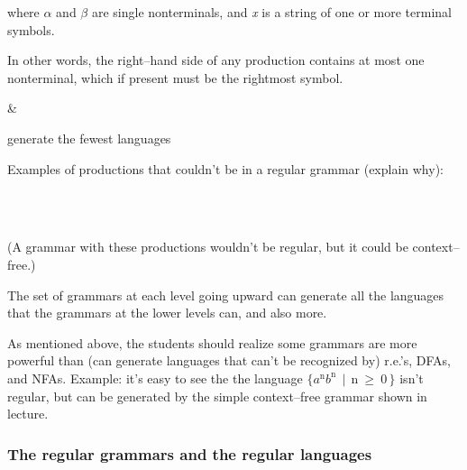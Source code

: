 \documentclass[12pt]{article}
\newcommand{\str}[1]{\emph{\textrm{#1}}}
\newcommand{\mathstr}[1]{\ensuremath{\mathit{#1}}}
\begin{document}
{\begin{longtable}[t]
\begin{multicols}{2}
            \end{multicols}

            \vspace{-3mm}

            where $\alpha$ and $\beta$ are single nonterminals, and \str{x}
            is a string of one or more terminal symbols.

            In other words, the right--hand side of any production contains
            at most one nonterminal, which if present must be the rightmost
            symbol.

          & \raggedright generate the fewest languages
          \tabularnewline

      \end{longtable}

    }

    \vspace{-6mm}

    Examples of productions that couldn't be in a regular grammar (explain
    why):

    \begin{grammar}[1.5]
      \production{\mathrm{S}}{S\mathstr{b}S}
        \\

      \production{\mathrm{S}}{\mathstr{b}S\mathstr{b}}
        \\

    \end{grammar}

    (A grammar with these productions wouldn't be regular, but it could be
     context--free.)

    \smallskip

    The set of grammars at each level going upward can generate all the
    languages that the grammars at the lower levels can, and also more.

    As mentioned above, the students should realize some grammars are more
    powerful than (can generate languages that can't be recognized by)
    r.e.'s, DFAs, and NFAs.  Example: it's easy to see the the language
    \(
      \mathrm{
        \{
          {\mathstr{a}^n}{\mathstr{b}^n} \, \mid \, n \: \ge \: 0 \,
        \}
      }
    \)
    isn't regular, but can be generated by the simple context--free
    grammar
               {\mathrm{\mathstr{a}S\mathstr{b} \mid \epsilon}}
    shown in lecture.

    \subsubsection{The regular grammars and the regular languages}
\end{document}
